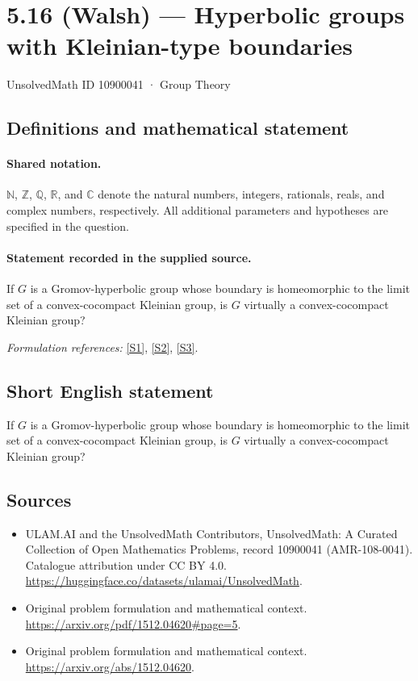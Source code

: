 \documentclass[11pt]{article}
\newcommand{\sref}[2]{\hyperlink{source:#1:#2}{[S#2]}}
\begin{document}
\setcounter{section}{10900040}
\section{5.16 (Walsh) — Hyperbolic groups with Kleinian-type boundaries}\label{10900041}
{\small UnsolvedMath ID 10900041 · Group Theory}
\subsection{Definitions and mathematical statement}

\paragraph{Shared notation.}$\mathbb N$, $\mathbb Z$, $\mathbb Q$, $\mathbb R$, and $\mathbb C$ denote the natural numbers, integers, rationals, reals, and complex numbers, respectively. All additional parameters and hypotheses are specified in the question.


\paragraph{Statement recorded in the supplied source.}
If $G$ is a Gromov-hyperbolic group whose boundary is homeomorphic to the limit set of a convex-cocompact Kleinian group, is $G$ virtually a convex-cocompact Kleinian group?
\par\smallskip\textit{Formulation references:} \sref{10900041}{1}, \sref{10900041}{2}, \sref{10900041}{3}.
\subsection{Short English statement}
If $G$ is a Gromov-hyperbolic group whose boundary is homeomorphic to the limit set of a convex-cocompact Kleinian group, is $G$ virtually a convex-cocompact Kleinian group?
\subsection{Sources}
\begin{itemize}
\item[\hypertarget{source:10900041:1}{S1}] ULAM.AI and the UnsolvedMath Contributors, UnsolvedMath: A Curated Collection of Open Mathematics Problems, record 10900041 (AMR-108-0041). Catalogue attribution under CC BY 4.0.
\url{https://huggingface.co/datasets/ulamai/UnsolvedMath}.
\item[\hypertarget{source:10900041:2}{S2}] Original problem formulation and mathematical context.
\url{https://arxiv.org/pdf/1512.04620#page=5}.
\item[\hypertarget{source:10900041:3}{S3}] Original problem formulation and mathematical context.
\url{https://arxiv.org/abs/1512.04620}.
\end{itemize}
\label{end:10900041}
\end{document}
